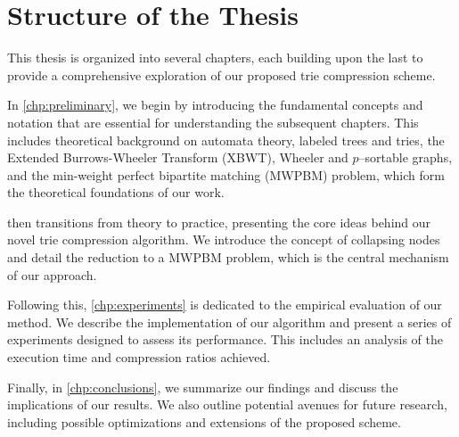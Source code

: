 \section{Structure of the Thesis}
This thesis is organized into several chapters, each building upon the last to provide a comprehensive exploration of our proposed trie compression scheme.

In \cref{chp:preliminary}, we begin by introducing the fundamental concepts and notation that are essential for understanding the subsequent chapters. This includes theoretical background on automata theory, labeled trees and tries, the Extended Burrows-Wheeler Transform (XBWT), Wheeler and $p$--sortable graphs, and the min-weight perfect bipartite matching (MWPBM) problem, which form the theoretical foundations of our work.

 then transitions from theory to practice, presenting the core ideas behind our novel trie compression algorithm. We introduce the concept of collapsing nodes and detail the reduction to a MWPBM problem, which is the central mechanism of our approach.

Following this, \cref{chp:experiments} is dedicated to the empirical evaluation of our method. We describe the implementation of our algorithm and present a series of experiments designed to assess its performance. This includes an analysis of the execution time and compression ratios achieved.

Finally, in \cref{chp:conclusions}, we summarize our findings and discuss the implications of our results. We also outline potential avenues for future research, including possible optimizations and extensions of the proposed scheme.